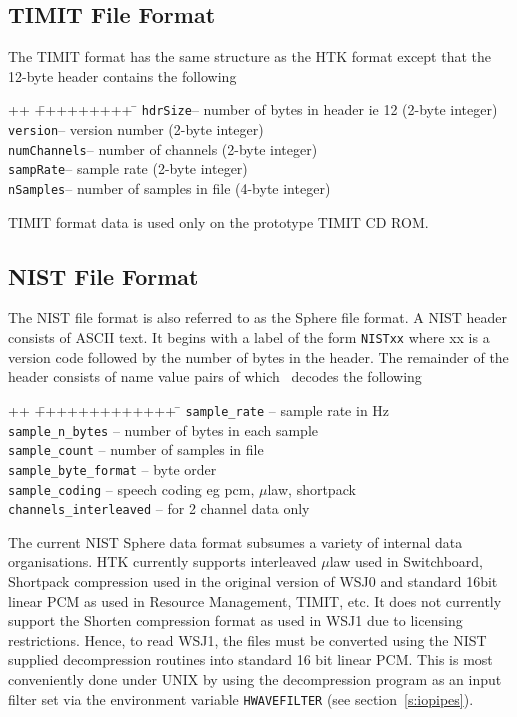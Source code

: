 \subsection{TIMIT File Format}

The TIMIT format has the same structure as the HTK format except that the
12-byte header contains the following

\begin{tabbing}
++ \= +++++++++ \= \kill
\>\texttt{hdrSize}\>-- number of bytes in header ie 12 (2-byte integer) \\
\>\texttt{version}\>-- version number (2-byte integer) \\
\>\texttt{numChannels}\>-- number of channels (2-byte integer) \\
\>\texttt{sampRate}\>-- sample rate (2-byte integer) \\
\>\texttt{nSamples}\>-- number of samples in file (4-byte integer) 
\end{tabbing}
TIMIT format data is used only on the prototype TIMIT CD ROM.

\subsection{NIST File Format}

The NIST file format is also referred to as the Sphere file format.
A NIST header consists of ASCII text.  It begins with a label of the
form  \texttt{NISTxx} where xx is a version code followed by the number
of bytes in the header.  The remainder of the header consists of
name value pairs of which \HTK\ decodes the following
\begin{tabbing}
++ \= +++++++++++++ \= \kill
\>\texttt{sample\_rate}  \>-- sample rate in Hz \\
\>\texttt{sample\_n\_bytes} \>-- number of bytes in each sample \\
\>\texttt{sample\_count} \>-- number of samples in file \\
\>\texttt{sample\_byte\_format} \>-- byte order \\
\>\texttt{sample\_coding} \>-- speech coding eg pcm, $\mu$law, shortpack \\
\>\texttt{channels\_interleaved} \>-- for 2 channel data only
\end{tabbing}
The current NIST Sphere data format subsumes a
variety of internal data organisations.  HTK currently supports interleaved
$\mu$law used in Switchboard, Shortpack compression used in the original
version of WSJ0 and standard 16bit linear PCM as used in Resource Management,
TIMIT, etc.  It does not currently support the Shorten compression format as
used in WSJ1 due to licensing restrictions.  Hence, to read WSJ1, the files
must be converted using the NIST supplied decompression routines into standard
16 bit linear PCM.  This is most conveniently done under UNIX by using the
decompression program as an input filter set via the environment variable
\texttt{HWAVEFILTER} (see
section~\ref{s:iopipes}).
    
